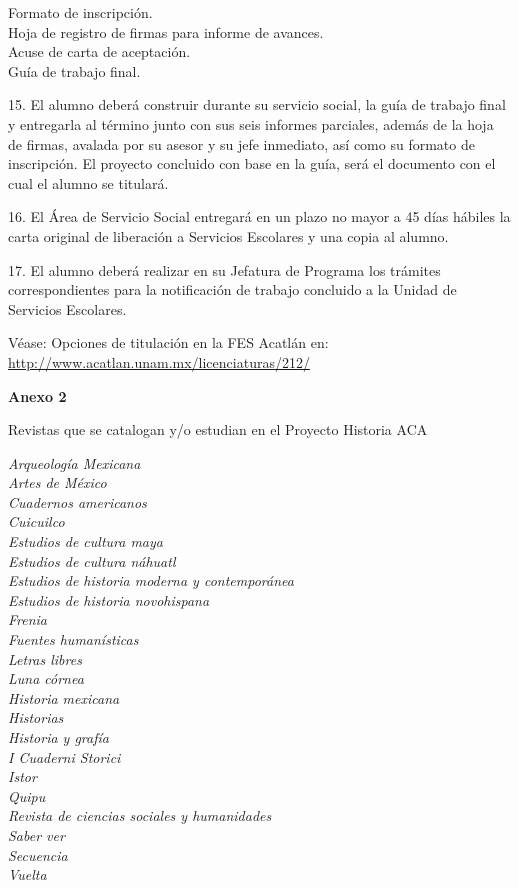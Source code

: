 \begin{footnotesize}
\begin{Obs}
Formato de inscripción.\\ 
Hoja de registro de firmas para informe de avances.\\  
Acuse de carta de aceptación.\\ 
Guía de trabajo final. 
\item[15.] El alumno deberá construir durante su servicio social, la guía de
trabajo final y entregarla al término junto con sus seis informes
parciales, además de la hoja de firmas, avalada por su asesor y su jefe
inmediato, así como su formato de inscripción. El proyecto concluido con
base en la guía, será el documento con el cual el alumno se titulará. 
\item[16.] El Área de Servicio Social entregará en un plazo no mayor a 45 días
hábiles la carta original de liberación a Servicios Escolares y una copia
al alumno. 
\item[17.] El alumno deberá realizar en su Jefatura de Programa los trámites
correspondientes para la notificación de trabajo concluido a la Unidad de
Servicios Escolares.

Véase: Opciones de titulación en la FES Acatlán en:\\
\url{http://www.acatlan.unam.mx/licenciaturas/212/} 
\end{Obs}

\medskip
\textbf{Anexo 2}

Revistas que se catalogan y\slash{}o estudian en el Proyecto Historia ACA

\textit{Arqueología Mexicana}\\
\textit{Artes de México}\\
\textit{Cuadernos americanos}\\
\textit{Cuicuilco}\\
\textit{Estudios de cultura maya}\\
\textit{Estudios de cultura náhuatl}\\
\textit{Estudios de historia moderna y contemporánea}\\
\textit{Estudios de historia novohispana}\\
\textit{Frenia}\\
\textit{Fuentes humanísticas}\\
\textit{Letras libres}\\
\textit{Luna córnea}\\
\textit{Historia mexicana}\\
\textit{Historias}\\
\textit{Historia y grafía}\\
\textit{I Cuaderni Storici}\\
\textit{Istor}\\
\textit{Quipu}\\
\textit{Revista de ciencias sociales y humanidades}\\
\textit{Saber ver}\\
\textit{Secuencia}\\
\textit{Vuelta}
\end{footnotesize}